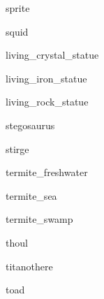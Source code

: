 \documentclass[letterpaper,serif]{module}
\begin{document}
\begin{newmonster}{sprite}\end{newmonster}

\begin{newmonster}{squid}\end{newmonster}

\begin{newmonster}{living_crystal_statue}\end{newmonster}

\begin{newmonster}{living_iron_statue}\end{newmonster}

\begin{newmonster}{living_rock_statue}\end{newmonster}

\begin{newmonster}{stegosaurus}\end{newmonster}

\begin{newmonster}{stirge}\end{newmonster}

\begin{newmonster}{termite_freshwater}\end{newmonster}

\begin{newmonster}{termite_sea}\end{newmonster}

\begin{newmonster}{termite_swamp}\end{newmonster}

\begin{newmonster}{thoul}\end{newmonster}

\begin{newmonster}{titanothere}\end{newmonster}

\begin{newmonster}{toad}\end{newmonster}
\end{document}
